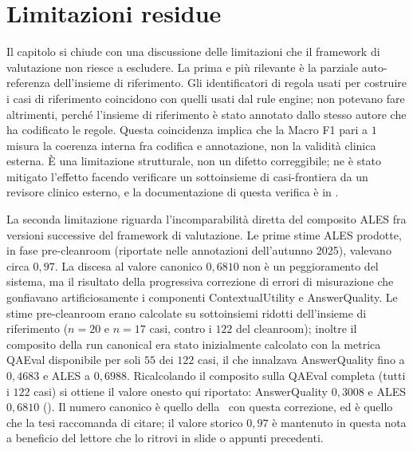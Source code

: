 \section{Limitazioni residue}
\label{sec:limitazioni}

Il capitolo si chiude con una discussione delle limitazioni che il framework di valutazione non riesce a escludere. La prima e più rilevante è la parziale auto-referenza dell'insieme di riferimento. Gli identificatori di regola usati per costruire i casi di riferimento coincidono con quelli usati dal rule engine; non potevano fare altrimenti, perché l'insieme di riferimento è stato annotato dallo stesso autore che ha codificato le regole. Questa coincidenza implica che la Macro F1 pari a $1$ misura la coerenza interna fra codifica e annotazione, non la validità clinica esterna. È una limitazione strutturale, non un difetto correggibile; ne è stato mitigato l'effetto facendo verificare un sottoinsieme di casi-frontiera da un revisore clinico esterno, e la documentazione di questa verifica è in .

La seconda limitazione riguarda l'incomparabilità diretta del composito ALES fra versioni successive del framework di valutazione. Le prime stime ALES prodotte, in fase pre-cleanroom (riportate nelle annotazioni dell'autunno 2025), valevano circa $0{,}97$. La discesa al valore canonico $0{,}6810$ non è un peggioramento del sistema, ma il risultato della progressiva correzione di errori di misurazione che gonfiavano artificiosamente i componenti ContextualUtility e AnswerQuality. Le stime pre-cleanroom erano calcolate su sottoinsiemi ridotti dell'insieme di riferimento ($n=20$ e $n=17$ casi, contro i $122$ del cleanroom); inoltre il composito della run canonical era stato inizialmente calcolato con la metrica QAEval disponibile per soli $55$ dei $122$ casi, il che innalzava AnswerQuality fino a $0{,}4683$ e ALES a $0{,}6988$. Ricalcolando il composito sulla QAEval completa (tutti i $122$ casi) si ottiene il valore onesto qui riportato: AnswerQuality $0{,}3008$ e ALES $0{,}6810$ (). Il numero canonico è quello della \cleanroomrun\ con questa correzione, ed è quello che la tesi raccomanda di citare; il valore storico $0{,}97$ è mantenuto in questa nota a beneficio del lettore che lo ritrovi in slide o appunti precedenti.

